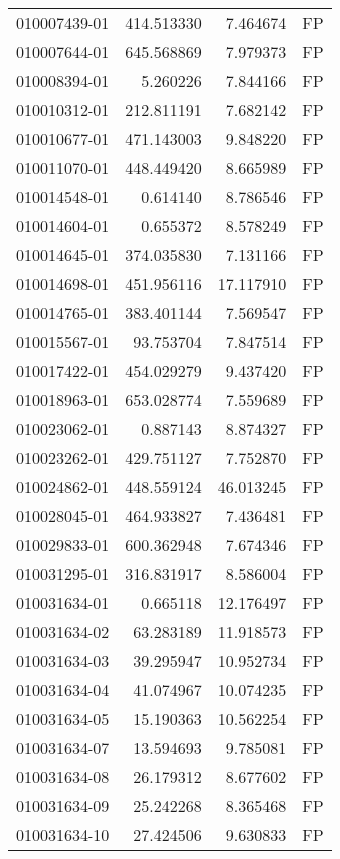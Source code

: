 \begin{tabular}{lrrl}
010007439-01 &  414.513330 &     7.464674 &   FP \\
010007644-01 &  645.568869 &     7.979373 &   FP \\
010008394-01 &    5.260226 &     7.844166 &   FP \\
010010312-01 &  212.811191 &     7.682142 &   FP \\
010010677-01 &  471.143003 &     9.848220 &   FP \\
010011070-01 &  448.449420 &     8.665989 &   FP \\
010014548-01 &    0.614140 &     8.786546 &   FP \\
010014604-01 &    0.655372 &     8.578249 &   FP \\
010014645-01 &  374.035830 &     7.131166 &   FP \\
010014698-01 &  451.956116 &    17.117910 &   FP \\
010014765-01 &  383.401144 &     7.569547 &   FP \\
010015567-01 &   93.753704 &     7.847514 &   FP \\
010017422-01 &  454.029279 &     9.437420 &   FP \\
010018963-01 &  653.028774 &     7.559689 &   FP \\
010023062-01 &    0.887143 &     8.874327 &   FP \\
010023262-01 &  429.751127 &     7.752870 &   FP \\
010024862-01 &  448.559124 &    46.013245 &   FP \\
010028045-01 &  464.933827 &     7.436481 &   FP \\
010029833-01 &  600.362948 &     7.674346 &   FP \\
010031295-01 &  316.831917 &     8.586004 &   FP \\
010031634-01 &    0.665118 &    12.176497 &   FP \\
010031634-02 &   63.283189 &    11.918573 &   FP \\
010031634-03 &   39.295947 &    10.952734 &   FP \\
010031634-04 &   41.074967 &    10.074235 &   FP \\
010031634-05 &   15.190363 &    10.562254 &   FP \\
010031634-07 &   13.594693 &     9.785081 &   FP \\
010031634-08 &   26.179312 &     8.677602 &   FP \\
010031634-09 &   25.242268 &     8.365468 &   FP \\
010031634-10 &   27.424506 &     9.630833 &   FP \\

\end{tabular}
